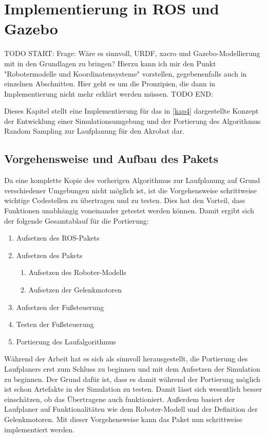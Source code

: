\chapter{Implementierung in ROS und Gazebo}
\label{kap5}

TODO START:
Frage: Wäre es sinnvoll, URDF, xacro und Gazebo-Modellierung mit in den Grundlagen zu bringen? Hierzu kann ich mir den Punkt "Robotermodelle und Koordinatensysteme" vorstellen, gegebenenfalls auch in einzelnen Abschnitten. Hier geht es um die Pronzipien, die dann in Implementierung nicht mehr erklärt werden müssen.
TODO END:


Dieses Kapitel stellt eine Implementierung für das in \autoref{kap4} dargestellte Konzept der Entwicklung einer Simulationsumgebung und der Portierung des Algorithmus Random Sampling zur Laufplanung für den Akrobat dar.

\section{Vorgehensweise und Aufbau des Pakets}

Da eine komplette Kopie des vorherigen Algorithmus zur Laufplanung auf Grund verschiedener Umgebungen nicht möglich ist, ist die Vorgehensweise schrittweise wichtige Codestellen zu übertragen und zu testen. Dies hat den Vorteil, dass Funktionen unabhängig voneinander getestet werden können. Damit ergibt sich der folgende Gesamtablauf für die Portierung:
\begin{enumerate}
  \item Aufsetzen des \ac{ROS}-Pakets
  \item Aufsetzen des Pakets
  \begin{enumerate}
    \item Aufsetzen des Roboter-Modells
    \item Aufsetzen der Gelenkmotoren
  \end{enumerate}
  \item Aufsetzen der Fußsteuerung
  \item Testen der Fußsteuerung
  \item Portierung des Laufalgorithmus
\end{enumerate}

Während der Arbeit hat es sich als sinnvoll herausgestellt, die Portierung des Laufplaners erst zum Schluss zu beginnen und mit dem Aufsetzen der Simulation zu beginnen. Der Grund dafür ist, dass es damit während der Portierung möglich ist schon Artefakte in der Simulation zu testen. Damit lässt sich wesentlich besser einschätzen, ob das Übertragene auch funktioniert. Außerdem basiert der Laufplaner auf Funktionalitäten wie dem Roboter-Modell und der Definition der Gelenkmotoren. Mit dieser Vorgehensweise kann das Paket nun schrittweise implementiert werden.

